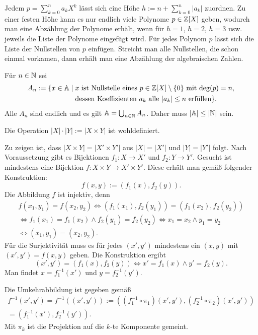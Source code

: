 \begin{Beweis}[Beweis 2]
Jedem $p=\sum_{k=0}^n a_kX^k$ lässt sich eine Höhe
$h:=n+\sum_{k=0}^n |a_k|$ zuordnen. Zu einer festen Höhe kann es nur
endlich viele Polynome $p\in\mathbb Z[X]$ geben, wodurch man eine Abzählung der
Polynome erhält, wenn für $h=1$, $h=2$, $h=3$ usw. jeweils die Liste
der Polynome eingefügt wird. Für jedes Polynom $p$ lässt sich die
Liste der Nullstellen von $p$ einfügen. Streicht man alle Nullstellen,
die schon einmal vorkamen, dann erhält man eine Abzählung der
algebraischen Zahlen.\,\qedsymbol
\end{Beweis}

\begin{Beweis}[Beweis 3]
Für $n\in\mathbb N$ sei
\[\begin{split}
A_n := \{x\in\mathbb A\mid \;&\text{$x$ ist Nullstelle eines
$p\in\mathbb Z[X]\setminus\{0\}$ mit $\deg(p)=n$,}\\
& \text{dessen Koeffizienten $a_k$ alle $|a_k|\le n$
erfüllen}\}.
\end{split}\]
Alle $A_n$ sind endlich und es gilt $\mathbb A=\bigcup_{n\in\mathbb N} A_n$.
Daher muss $|\mathbb A|\le |\mathbb N|$ sein.\,\qedsymbol
\end{Beweis}

\begin{Definition}\newlinefirst
Die Operation $|X|\cdot |Y|:=|X\times Y|$ ist wohldefiniert.
\end{Definition}
\begin{Beweis}
Zu zeigen ist, dass $|X\times Y|=|X'\times Y'|$
aus $|X|=|X'|$ und $|Y|=|Y'|$ folgt. Nach Voraussetzung gibt
es Bijektionen $f_1\colon X\to X'$ und $f_2\colon Y\to Y'$. Gesucht
ist mindestens eine Bijektion $f\colon X\times Y\to X'\times Y'$.
Diese erhält man gemäß folgender Konstruktion:
\[f(x,y) := (f_1(x),f_2(y)).\]
Die Abbildung $f$ ist injektiv, denn
\begin{gather*}
f(x_1,y_1)=f(x_2,y_2) \iff (f_1(x_1),f_2(y_1))=(f_1(x_2),f_2(y_2))\\
\iff f_1(x_1)=f_1(x_2)\land f_2(y_1)=f_2(y_2)\iff x_1=x_2\land y_1=y_2\\
\iff (x_1,y_1)=(x_2,y_2).
\end{gather*}
Für die Surjektivität muss es für jedes $(x',y')$ mindestens
ein $(x,y)$ mit $(x',y')=f(x,y)$ geben. Die Konstruktion ergibt
\[(x',y')=(f_1(x),f_2(y))\iff x'=f_1(x)\land y'=f_2(y).\]
Man findet $x=f_1^{-1}(x')$ und $y=f_2^{-1}(y')$.

Die Umkehrabbildung ist gegeben gemäß
\begin{gather*}
f^{-1}(x',y')=f^{-1}((x',y')):=((f_1^{-1}\circ\pi_1)(x',y'),(f_2^{-1}\circ\pi_2)(x',y'))\\
= (f_1^{-1}(x'),f_2^{-1}(y')).
\end{gather*}
Mit $\pi_k$ ist die Projektion auf die $k$-te Komponente gemeint.\;\qedsymbol
\end{Beweis}

